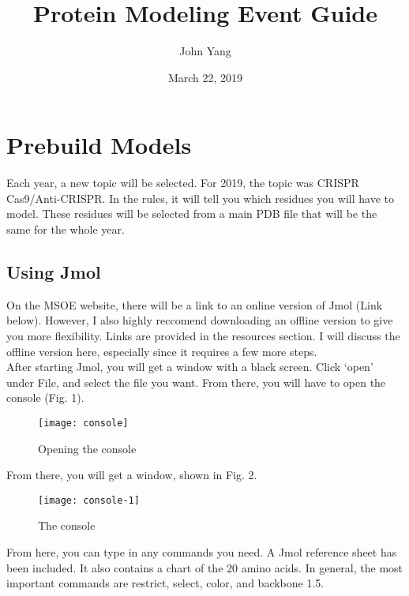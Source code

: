 \documentclass[twocolumn]{article}
\title{Protein Modeling Event Guide}
\author{John Yang}
\date{March 22, 2019}
\begin{document}

\section{Prebuild Models}
Each year, a new topic will be selected. For 2019, the topic was CRISPR Cas9/Anti-CRISPR. In the rules, it will tell you which residues you will have to model. These residues will be selected from a main PDB file that will be the same for the whole year. 
\subsection{Using Jmol}
On the MSOE website, there will be a link to an online version of Jmol (Link below). However, I also highly reccomend downloading an offline version to give you more flexibility. Links are provided in the resources section. I will discuss the offline version here, especially since it requires a few more steps. \\
After starting Jmol, you will get a window with a black screen. Click `open' under File, and select the file you want. From there, you will have to open the console (Fig. 1). 
\begin{figure}[h]
\caption{Opening the console}
\centering
\texttt{[image: console]}
\end{figure}
From there, you will get a window, shown in Fig. 2. 
\begin{figure}[h]
\caption{The console}
\centering
\texttt{[image: console-1]}
\end{figure}
From here, you can type in any commands you need. A Jmol reference sheet has been included. It also contains a chart of the 20 amino acids. In general, the most important commands are 
{\selectfont restrict}, {\selectfont select}, {\selectfont color}, and {\selectfont backbone 1.5}. 
\end{document}
